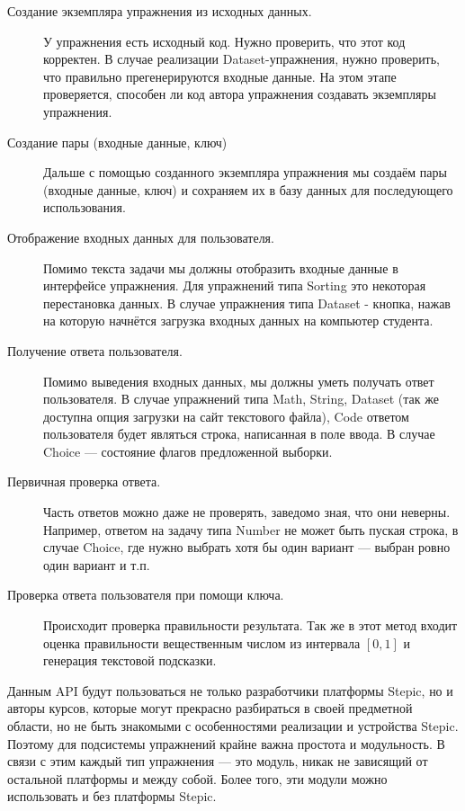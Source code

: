 \documentclass{matmex-diploma-custom}
\begin{document}
\begin{description}
\item[Создание экземпляра упражнения из исходных данных.]

  У упражнения есть исходный код. Нужно проверить, что этот код
  корректен. В случае реализации Dataset-упражнения, нужно проверить,
  что правильно прегенерируются входные данные. На этом этапе
  проверяется, способен ли код автора упражнения создавать экземпляры
  упражнения.

\item[Создание пары (входные данные, ключ)]

  Дальше с помощью созданного экземпляра упражнения мы создаём пары
  (входные данные, ключ) и сохраняем их в базу данных для последующего
  использования.

\item[Отображение входных данных для пользователя.]

  Помимо текста задачи мы должны отобразить входные данные в
  интерфейсе упражнения. Для упражнений типа Sorting это некоторая
  перестановка данных. В случае упражнения типа Dataset - кнопка,
  нажав на которую начнётся загрузка входных данных на компьютер
  студента.

\item[Получение ответа пользователя.]

  Помимо выведения входных данных, мы должны уметь получать ответ
  пользователя. В случае упражнений типа Math, String, Dataset (так же
  доступна опция загрузки на сайт текстового файла), Code ответом
  пользователя будет являться строка, написанная в поле ввода. В
  случае Choice --- состояние флагов предложенной выборки.

\item[Первичная проверка ответа.]

  Часть ответов можно даже не проверять, заведомо зная, что они
  неверны. Например, ответом на задачу типа Number не может быть
  пуская строка, в случае Choice, где нужно выбрать хотя бы один
  вариант --- выбран ровно один вариант и т.п.

\item[Проверка ответа пользователя при помощи ключа.]

  Происходит проверка правильности результата. Так же в этот метод
  входит оценка правильности вещественным числом из интервала $[0, 1]$
  и генерация текстовой подсказки.
\end{description}

Данным API будут пользоваться не только разработчики платформы Stepic,
но и авторы курсов, которые могут прекрасно разбираться в своей
предметной области, но не быть знакомыми с особенностями реализации и
устройства Stepic. Поэтому для подсистемы упражнений крайне важна
простота и модульность. В связи с этим каждый тип упражнения --- это
модуль, никак не зависящий от остальной платформы и между собой. Более
того, эти модули можно использовать и без платформы Stepic.
\end{document}
